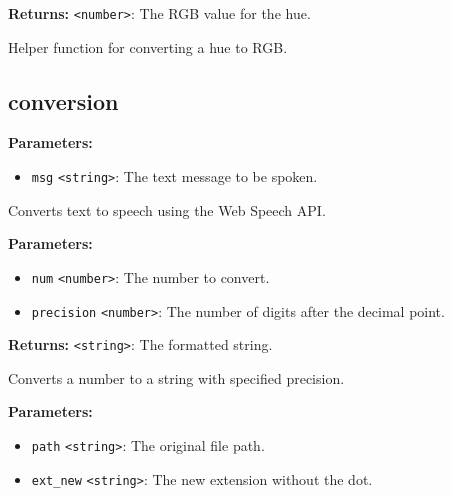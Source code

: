\documentclass[12pt,a4paper]{article}
\begin{document}
\noindent \textbf{Returns:} \texttt{<number>}: The RGB value for the hue.

\noindent Helper function for converting a hue to RGB.


\subsection{conversion}
\vspace{5mm}
\noindent {}


\noindent \textbf{Parameters:}
\begin{itemize}
  \item \texttt{msg} \texttt{<string>}: The text message to be spoken.
\end{itemize}

\noindent Converts text to speech using the Web Speech API.

\vspace{5mm}
\noindent {}


\noindent \textbf{Parameters:}
\begin{itemize}
  \item \texttt{num} \texttt{<number>}: The number to convert.
  \item \texttt{precision} \texttt{<number>}: The number of digits after the decimal point.
\end{itemize}

\noindent \textbf{Returns:} \texttt{<string>}: The formatted string.

\noindent Converts a number to a string with specified precision.

\vspace{5mm}
\noindent {}


\noindent \textbf{Parameters:}
\begin{itemize}
  \item \texttt{path} \texttt{<string>}: The original file path.
  \item \texttt{ext\_new} \texttt{<string>}: The new extension without the dot.
\end{itemize}
\end{document}
